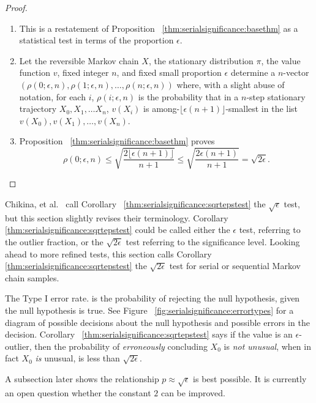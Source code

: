 \documentclass[12pt]{article}
\begin{document}
\begin{proof}
    \begin{enumerate}
        \item
            This is a restatement of Proposition~%
            \ref{thm:serialsignificance:basethm} as a statistical test
            in terms of the proportion \( \epsilon \).
        \item
            Let the reversible Markov chain \( X \), the stationary
            distribution \( \pi \), the value function \( v \), fixed
            integer \( n \), and fixed small proportion \( \epsilon \)
            determine a \( n \)-vector \( (\rho(0; \epsilon, n), \rho(1;
            \epsilon, n), \dots, \rho(n; \epsilon, n)) \) where, with a
            slight abuse of notation, for each \( i \), \( \rho(i;
            \epsilon, n) \) is the probability that in a \( n \)-step
            stationary trajectory \( X_0, X_1, \dots X_n \), \( v(X_i) \)
            is among-\( \lfloor \epsilon(n+1) \rfloor \)-smallest in the
            list \( v(X_0), v(X_1), \dots, v(X_n) \).
        \item
            Proposition~%
            \ref{thm:serialsignificance:basethm} proves
            \[
                \rho(0; \epsilon, n) \le \sqrt{\frac{2 \lfloor \epsilon
                (n+1) \rfloor}{n+1}} \le \sqrt{\frac{2 \epsilon (n+1)}{n+1}}
                = \sqrt{2\epsilon}.
            \]
    \end{enumerate}
\end{proof}

\begin{remark}
    Chikina, et al.~%
    \cite{Chikina2860} call Corollary~%
    \ref{thm:serialsignificance:sqrtepstest} the \( \sqrt{\epsilon} \)
    test, but this section slightly revises their terminology.
    Corollary~%
    \ref{thm:serialsignificance:sqrtepstest} could be called either the \(
    \epsilon \) test, referring to the outlier fraction, or the \( \sqrt
    {2 \epsilon} \) test referring to the significance level.  Looking
    ahead to more refined tests, this section calls Corollary~%
    \ref{thm:serialsignificance:sqrtepstest} the \( \sqrt{2 \epsilon} \)
    test for serial or sequential Markov chain samples.
\end{remark}

\begin{remark}
    The Type I error rate.%
    is the probability of rejecting the null hypothesis, given the null
    hypothesis is true.  See Figure~%
    \ref{fig:serialsignificance:errortypes} for a diagram of possible
    decisions about the null hypothesis and possible errors in the
    decision.  Corollary~%
    \ref{thm:serialsignificance:sqrtepstest} says if the value is an \(
    \epsilon \)-outlier, then the probability of \emph{erroneously}
    concluding \( X_0 \) is \emph{not unusual}, when in fact \( X_0 \)
    \emph{is} unusual, is less than \( \sqrt{2 \epsilon } \).

    A subsection later shows the relationship \( p \approx \sqrt{\epsilon}
    \) is best possible.  It is currently an open question whether the
    constant \( 2 \) can be improved.
\end{remark}
\end{document}
